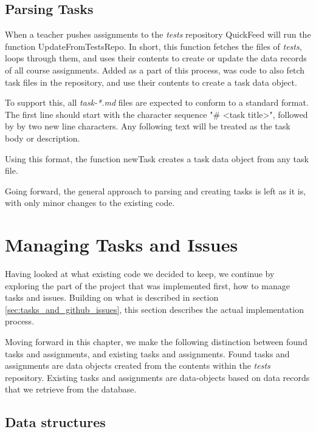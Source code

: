 \subsection{Parsing Tasks}
\label{sec:parsing_tasks}

When a teacher pushes assignments to the \textit{tests} repository QuickFeed will run the function UpdateFromTestsRepo.
In short, this function fetches the files of \textit{tests}, loops through them, and uses their contents to create or update the data records of all course assignments.
Added as a part of this process, was code to also fetch task files in the repository, and use their contents to create a task data object.

To support this, all \textit{task-*.md} files are expected to conform to a standard format.
The first line should start with the character sequence "\# <task title>", followed by by two new line characters.
Any following text will be treated as the task body or description.

Using this format, the function newTask creates a task data object from any task file.



Going forward, the general approach to parsing and creating tasks is left as it is, with only minor changes to the existing code.

\section{Managing Tasks and Issues}

Having looked at what existing code we decided to keep, we continue by exploring the part of the project that was implemented first, how to manage tasks and issues.
Building on what is described in section \ref{sec:tasks_and_github_issues}, this section describes the actual implementation process.

Moving forward in this chapter, we make the following distinction between found tasks and assignments, and existing tasks and assignments.
Found tasks and assignments are data objects created from the contents within the \textit{tests} repository.
Existing tasks and assignments are data-objects based on data records that we retrieve from the database.

\subsection{Data structures}

